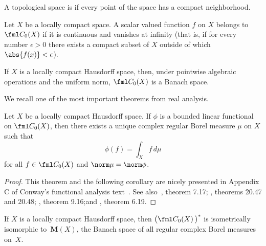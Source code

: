 \begin{defn} A topological space is
 if every point of the space has a compact neighborhood.
\end{defn}

\begin{notn} Let $X$ be a locally compact space.  A scalar valued function $f$ on $X$ belongs to $\fml C_0(X)$ if
it is continuous and vanishes at infinity (that is, if for every number $\epsilon > 0$ there exists a compact subset
of $X$ outside of which $\abs{f(x)} < \epsilon$).
\end{notn}

\begin{exam}\label{exam_C0X} If $X$ is a locally compact Hausdorff space, then, under pointwise algebraic operations and the uniform norm,
$\fml C_0(X)$ is a Banach space.
\end{exam}

We recall one of the most important theorems from real analysis.

\begin{thm}\label{C057951} Let $X$ be a locally compact Hausdorff
space.  If $\phi$ is a bounded linear functional on $\fml C_0(X)$, then there exists a
unique complex regular Borel measure $\mu$ on $X$ such that
  \[ \phi(f) = \int_X f\,d\mu \]
for all $f \in \fml C_0(X)$ and $\norm\mu = \norm\phi$.
\end{thm}

\begin{proof} This theorem and the following corollary are nicely presented in Appendix C of Conway's
functional analysis text~\cite{Conway:1990}. See also~\cite{Folland:1984}, theorem 7.17; \cite{HewittS:1965},
theorems 20.47 and 20.48; \cite{McDonaldW:1999}, theorem 9.16;and \cite{Rudin:1987}, theorem 6.19.  \ns
\end{proof}

\begin{cor}\label{C057952} If $X$ is a locally compact Hausdorff space, then $\bigl(\fml C_0(X)\,\bigr)^*$
is isometrically isomorphic to~$\textbf{M}(X)$,
the Banach space of all regular complex Borel measures on~$X$.
\end{cor}

